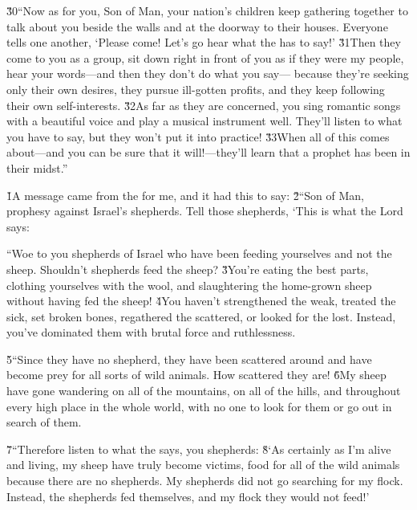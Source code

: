\v{30}``Now as for you, Son of Man, your nation's children keep gathering together to talk about you beside the walls and at the doorway to their houses. Everyone tells one another, `Please come! Let's go hear what the  has to say!' \v{31}Then they come to you as a group, sit down right in front of you as if they were my people, hear your words---and then they don't do what you say--- because they're seeking only their own desires, they pursue ill-gotten profits, and they keep following their own self-interests. \v{32}As far as they are concerned, you sing romantic songs with a beautiful voice and play a musical instrument well. They'll listen to what you have to say, but they won't put it into practice! \v{33}When all of this comes about---and you can be sure that it will!---they'll learn that a prophet has been in their midst.''

\v{1}A message came from the  for me, and it had this to say: \v{2}``Son of Man, prophesy against Israel's shepherds. Tell those shepherds, `This is what the Lord  says:

``Woe to you shepherds of Israel who have been feeding yourselves and not the sheep. Shouldn't shepherds feed the sheep? \v{3}You're eating the best parts, clothing yourselves with the wool, and slaughtering the home-grown sheep without having fed the sheep! \v{4}You haven't strengthened the weak, treated the sick, set broken bones, regathered the scattered, or looked for the lost. Instead, you've dominated them with brutal force and ruthlessness.

\v{5}``Since they have no shepherd, they have been scattered around and have become prey for all sorts of wild animals. How scattered they are! \v{6}My sheep have gone wandering on all of the mountains, on all of the hills, and throughout every high place in the whole world, with no one to look for them or go out in search of them.

\v{7}``Therefore listen to what the  says, you shepherds: \v{8}`As certainly as I'm alive and living, my sheep have truly become victims, food for all of the wild animals because there are no shepherds. My shepherds did not go searching for my flock. Instead, the shepherds fed themselves, and my flock they would not feed!'

